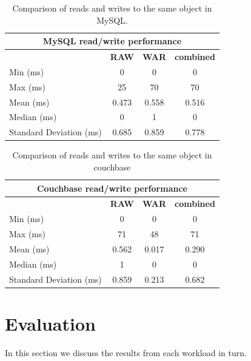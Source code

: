 \documentclass[10pt, conference, compsocconf]{IEEEtran}
\begin{document}
\begin{table}[t]
   \centering
      \begin{tabular}{| l | c | c | c |}
         \hline
            \multicolumn{4}{|c|}{{\textbf{MySQL read/write performance}}} \\
         \hline
            & \textbf{RAW} & \textbf{WAR} & \textbf{combined} \\
         \hline
            Min (ms) & 0 & 0 & 0 \\
         \hline
            Max (ms) & 25 & 70 & 70 \\
         \hline
            Mean (ms) & 0.473 & 0.558 & 0.516 \\
         \hline
            Median (ms) & 0 & 1 & 0 \\
         \hline
            Standard Deviation (ms) & 0.685 & 0.859 & 0.778 \\
         \hline
      \end{tabular}
      \caption{Comparison of reads and writes to the same object in MySQL.}
      \label{tab:sql_perf}
\end{table}

\begin{table}[t]
   \centering
      \begin{tabular}{| l | c | c | c |}
         \hline
            \multicolumn{4}{|c|}{{\textbf{Couchbase read/write performance}}} \\
         \hline
            & \textbf{RAW} & \textbf{WAR} & \textbf{combined} \\
         \hline
            Min (ms) & 0 & 0 & 0 \\
         \hline
            Max (ms) & 71 & 48 & 71 \\
         \hline
            Mean (ms) & 0.562 & 0.017 & 0.290 \\
         \hline
            Median (ms) & 1 & 0 & 0 \\
         \hline
            Standard Deviation (ms) & 0.859 & 0.213 & 0.682 \\
         \hline
      \end{tabular}
      \caption{Comparison of reads and writes to the same object in couchbase}
      \label{tab:couch_perf}
\end{table}

\section{Evaluation}\label{sec:eval}
In this section we discuss the results from each workload in turn.
\end{document}
